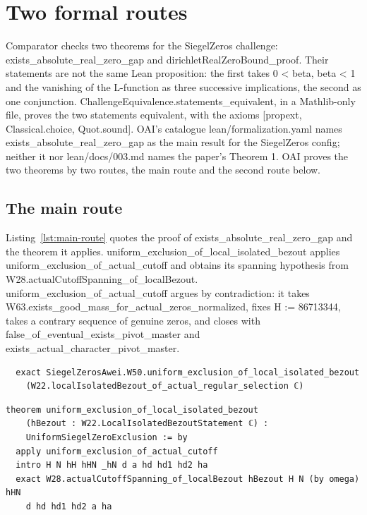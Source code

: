 \section{Two formal routes}\label{sec:gap}

Comparator checks two theorems for the SiegelZeros challenge: exists\_absolute\_real\_zero\_gap and dirichletRealZeroBound\_proof.
Their statements are not the same Lean proposition: the first takes 0 < beta, beta < 1 and the vanishing of the L-function as three successive implications, the second as one conjunction.
ChallengeEquivalence.statements\_equivalent, in a Mathlib-only file, proves the two statements equivalent, with the axioms [propext, Classical.choice, Quot.sound].
OAI's catalogue lean/formalization.yaml names exists\_absolute\_real\_zero\_gap as the main result for the SiegelZeros config; neither it nor lean/docs/003.md names the paper's Theorem 1.
OAI proves the two theorems by two routes, the main route and the second route below.

\subsection{The main route}

Listing~\ref{lst:main-route} quotes the proof of exists\_absolute\_real\_zero\_gap and the theorem it applies.
uniform\_exclusion\_of\_local\_isolated\_bezout applies uniform\_exclusion\_of\_actual\_cutoff and obtains its spanning hypothesis from W28.actualCutoffSpanning\_of\_localBezout.
uniform\_exclusion\_of\_actual\_cutoff argues by contradiction: it takes W63.exists\_good\_mass\_for\_actual\_zeros\_normalized, fixes H := 86713344, takes a contrary sequence of genuine zeros, and closes with false\_of\_eventual\_exists\_pivot\_master and exists\_actual\_character\_pivot\_master.

\begin{listing}[tbp]
\caption{The main route: OAI/\allowbreak NumberTheory/\allowbreak SiegelZeros/\allowbreak Conclusions/\allowbreak Theorem.lean:18-19 and Intersection/BezoutBoundary.lean:13-19 (openai/math fd4aeeb).}\label{lst:main-route}
\begin{Verbatim}
  exact SiegelZerosAwei.W50.uniform_exclusion_of_local_isolated_bezout
    (W22.localIsolatedBezout_of_actual_regular_selection ℂ)
\end{Verbatim}
\begin{Verbatim}
theorem uniform_exclusion_of_local_isolated_bezout
    (hBezout : W22.LocalIsolatedBezoutStatement ℂ) :
    UniformSiegelZeroExclusion := by
  apply uniform_exclusion_of_actual_cutoff
  intro H N hH hHN _hN d a hd hd1 hd2 ha
  exact W28.actualCutoffSpanning_of_localBezout hBezout H N (by omega) hHN
    d hd hd1 hd2 a ha
\end{Verbatim}
\end{listing}

